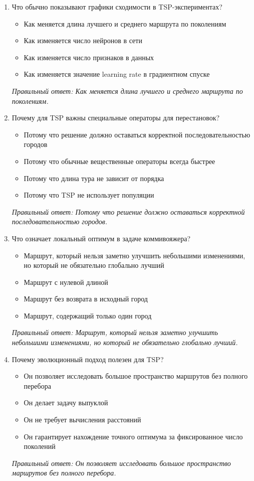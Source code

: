 \begin{enumerate}[label=\textbf{\arabic*.}, leftmargin=0pt, itemsep=1.2em]
\item Что обычно показывают графики сходимости в TSP-экспериментах?
\begin{itemize}[label=$\square$, leftmargin=1.5cm, itemsep=0.2em, topsep=0.3em]
\item Как меняется длина лучшего и среднего маршрута по поколениям
\item Как изменяется число нейронов в сети
\item Как изменяется число признаков в данных
\item Как изменяется значение learning rate в градиентном спуске
\end{itemize}
{\small\textit{Правильный ответ: Как меняется длина лучшего и среднего маршрута по поколениям.}}

\item Почему для TSP важны специальные операторы для перестановок?
\begin{itemize}[label=$\square$, leftmargin=1.5cm, itemsep=0.2em, topsep=0.3em]
\item Потому что решение должно оставаться корректной последовательностью городов
\item Потому что обычные вещественные операторы всегда быстрее
\item Потому что длина тура не зависит от порядка
\item Потому что TSP не использует популяции
\end{itemize}
{\small\textit{Правильный ответ: Потому что решение должно оставаться корректной последовательностью городов.}}

\item Что означает локальный оптимум в задаче коммивояжера?
\begin{itemize}[label=$\square$, leftmargin=1.5cm, itemsep=0.2em, topsep=0.3em]
\item Маршрут, который нельзя заметно улучшить небольшими изменениями, но который не обязательно глобально лучший
\item Маршрут с нулевой длиной
\item Маршрут без возврата в исходный город
\item Маршрут, содержащий только один город
\end{itemize}
{\small\textit{Правильный ответ: Маршрут, который нельзя заметно улучшить небольшими изменениями, но который не обязательно глобально лучший.}}

\item Почему эволюционный подход полезен для TSP?
\begin{itemize}[label=$\square$, leftmargin=1.5cm, itemsep=0.2em, topsep=0.3em]
\item Он позволяет исследовать большое пространство маршрутов без полного перебора
\item Он делает задачу выпуклой
\item Он не требует вычисления расстояний
\item Он гарантирует нахождение точного оптимума за фиксированное число поколений
\end{itemize}
{\small\textit{Правильный ответ: Он позволяет исследовать большое пространство маршрутов без полного перебора.}}


\end{enumerate}

